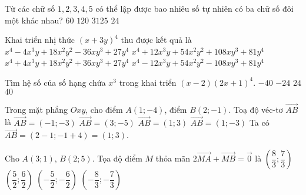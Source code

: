 \begin{ex}%
Từ các chữ số $1,2,3,4,5$ có thể lập được bao nhiêu số tự nhiên có ba chữ số đôi một khác nhau?
\choice
{\True $60$}
{$120$}
{$3125$}
{$24$}
\end{ex}

\begin{ex}%
Khai triển nhị thức $(x+3y)^4$ thu được kết quả là
\choice
{$x^4-4 x^3 y+18 x^2 y^2-36 x y^3+27 y^4$}
{\True $x^4+12 x^3 y+54 x^2 y^2+108 x y^3+81 y^4$}
{$x^4+4 x^3 y+18 x^2 y^2+36 x y^3+27 y^4$}
{$x^4-12 x^3 y+54 x^2 y^2-108 x y^3+81 y^4$}
\end{ex}

\begin{ex}%
Tìm hệ số của số hạng chứa $x^3$ trong khai triển $(x-2)(2x+1)^4$.
\choice
{\True $-40$}
{$-24$}
{$24$}
{$40$}
\end{ex}

\begin{ex}%
Trong mặt phẳng $Oxy$, cho điểm $A(1;-4)$, điểm $B(2;-1)$. Toạ độ véc-tơ $\vec{AB}$ là
\choice
{$\vec{AB}= (-1;-3)$}
{$\vec{AB}= (3;-5)$}
{\True $\vec{AB}= (1;3)$}
{$\vec{AB}= (1;-3)$}
\loigiai
{
Ta có $\vec{AB}= (2-1; -1+4)= (1;3)$.
}
\end{ex}

\begin{ex}%
Cho $A(3;1)$, $B(2;5)$. Tọa độ điểm $M$ thỏa mãn $2 \overrightarrow{MA}+\overrightarrow{MB} = \overrightarrow{0}$ là
\choice
{\True $\left(\dfrac{8}{3};\dfrac{7}{3}\right)$}
{$\left(\dfrac{5}{2};\dfrac{6}{2}\right)$}
{$\left(-\dfrac{5}{2};-\dfrac{6}{2}\right)$}
{$\left(-\dfrac{8}{3};-\dfrac{7}{3}\right)$}
\end{ex}


